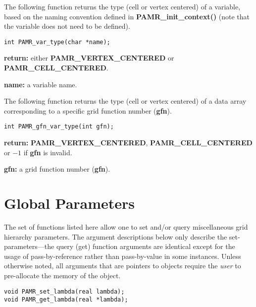 \documentclass[aps,amssymb,unsortedaddress,nofootinbib]{revtex4}
\def\lsep{\itemsep 0.05in}
\begin{document}
The following function returns the type (cell or vertex centered) of a 
variable, based on the naming convention defined in 
{\bf PAMR\_init\_context()} (note that the variable does not need to be defined).

\begin{verbatim}
int PAMR_var_type(char *name);
\end{verbatim}
\begin{list}{}{\lsep}
\item {\bf return:} either {\bf PAMR\_VERTEX\_CENTERED} or {\bf PAMR\_CELL\_CENTERED}.
\item {\bf *name:} a variable name.
\end{list}

The following function returns the type (cell or vertex centered) of a 
data array corresponding to a specific grid function number ({\bf gfn}). 

\begin{verbatim}
int PAMR_gfn_var_type(int gfn);
\end{verbatim}
\begin{list}{}{\lsep}
\item {\bf return:} {\bf PAMR\_VERTEX\_CENTERED}, {\bf PAMR\_CELL\_CENTERED} or $-1$
                    if {\bf gfn} is invalid.
\item {\bf gfn:} a grid function number ({\bf gfn}).
\end{list}


\section{Global Parameters}

The set of functions listed here allow one to set and/or query miscellaneous
grid hierarchy parameters. The argument descriptions below only describe the
set-parameters---the query (get) function arguments are identical except
for the usage of pass-by-reference rather than pass-by-value in some instances.
Unless otherwise noted, all arguments that are pointers to objects require
the {\em user} to pre-allocate the memory of the object.


\begin{verbatim}
void PAMR_set_lambda(real lambda);
void PAMR_get_lambda(real *lambda);
\end{verbatim}
\end{document}
